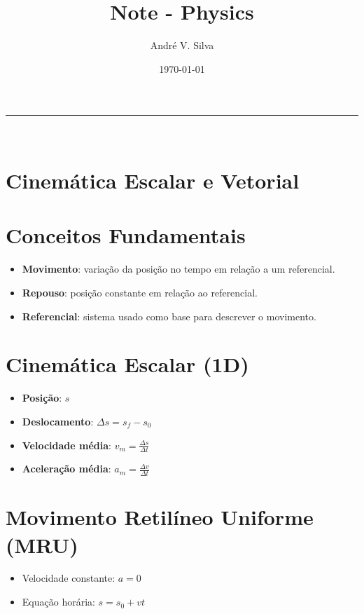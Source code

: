 \documentclass[a4paper,12pt]{article}
\title{ \textbf{\large Note - Physics}}
\author{Andr\'e V. Silva}
\date{\today}
\begin{document}
\justifying

\begin{multicols}{2}

\maketitle

\noindent\rule{\linewidth}{0.4pt}\\
\section{Cinemática Escalar e Vetorial}

\section{Conceitos Fundamentais}
\begin{itemize}
  \item \textbf{Movimento}: variação da posição no tempo em relação a um referencial.
  \item \textbf{Repouso}: posição constante em relação ao referencial.
  \item \textbf{Referencial}: sistema usado como base para descrever o movimento.
\end{itemize}

\section{Cinemática Escalar (1D)}
\begin{itemize}
  \item \textbf{Posição}: $s$
  \item \textbf{Deslocamento}: $\Delta s = s_f - s_0$
  \item \textbf{Velocidade média}: $v_m = \frac{\Delta s}{\Delta t}$
  \item \textbf{Aceleração média}: $a_m = \frac{\Delta v}{\Delta t}$
\end{itemize}

\section{Movimento Retilíneo Uniforme (MRU)}
\begin{itemize}
  \item Velocidade constante: $a = 0$
  \item Equação horária: $s = s_0 + v t$
\end{itemize}


\end{multicols}
\end{document}
